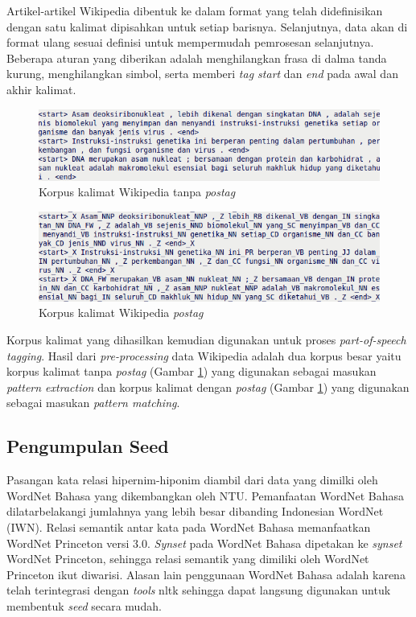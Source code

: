 Artikel-artikel Wikipedia dibentuk ke dalam format yang telah didefinisikan dengan satu kalimat dipisahkan untuk setiap barisnya. Selanjutnya, data akan di format ulang sesuai definisi untuk mempermudah pemrosesan selanjutnya. Beberapa aturan yang diberikan adalah menghilangkan frasa di dalma tanda kurung, menghilangkan simbol, serta memberi \textit{tag start} dan \textit{end} pada awal dan akhir kalimat.

\begin{figure}
    \centering
    \includegraphics[width=\linewidth]{pics/kalimatWiki}
    \caption{Korpus kalimat Wikipedia tanpa \textit{postag}}
    \label{fig:kalimat-wiki}
\end{figure}

\begin{figure}
    \centering
    \includegraphics[width=\linewidth]{pics/kalimatWikiTag}
    \caption{Korpus kalimat Wikipedia \textit{postag}}
    \label{fig:kalimat-wiki-tag}
\end{figure}

\noindent Korpus kalimat yang dihasilkan kemudian digunakan untuk proses \textit{part-of-speech tagging}. Hasil dari \textit{pre-processing} data Wikipedia adalah dua korpus besar yaitu korpus kalimat tanpa \textit{postag} (Gambar \ref{fig:kalimat-wiki}) yang digunakan sebagai masukan \textit{pattern extraction} dan korpus kalimat dengan \textit{postag} (Gambar \ref{fig:kalimat-wiki}) yang digunakan sebagai masukan \textit{pattern matching}. 

\subsection{Pengumpulan Seed}
Pasangan kata relasi hipernim-hiponim diambil dari data yang dimilki oleh WordNet Bahasa yang dikembangkan oleh NTU. Pemanfaatan WordNet Bahasa dilatarbelakangi jumlahnya yang lebih besar dibanding Indonesian WordNet (IWN). Relasi semantik antar kata pada WordNet Bahasa memanfaatkan WordNet Princeton versi 3.0. \textit{Synset} pada WordNet Bahasa dipetakan ke \textit{synset} WordNet Princeton, sehingga relasi semantik yang dimiliki oleh WordNet Princeton ikut diwarisi. Alasan lain penggunaan WordNet Bahasa adalah karena telah terintegrasi dengan \textit{tools} nltk sehingga dapat langsung digunakan untuk membentuk \textit{seed} secara mudah.

